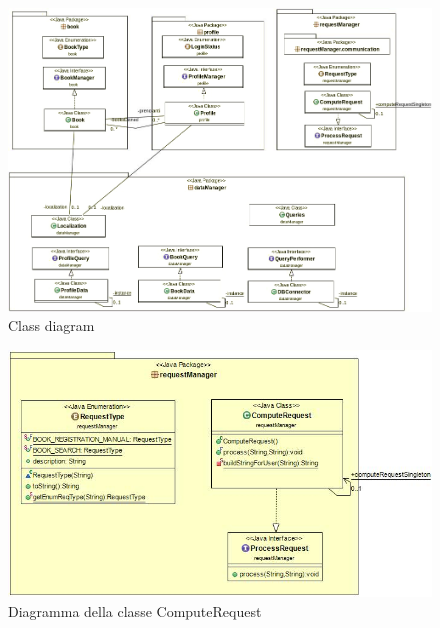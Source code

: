 \begin{figure}[h]
	\includegraphics[width=\textwidth]{Immagini/iterazione_1_uml}
	\caption{Class diagram}
	\label{fig:xx}
\end{figure}

\begin{figure}[h]
	\includegraphics[width=\textwidth]{Immagini/UML_ComputeRequestServer}
	\caption{Diagramma della classe ComputeRequest}
	\label{fig:Diagramma della class ComputeRequest}
\end{figure}

